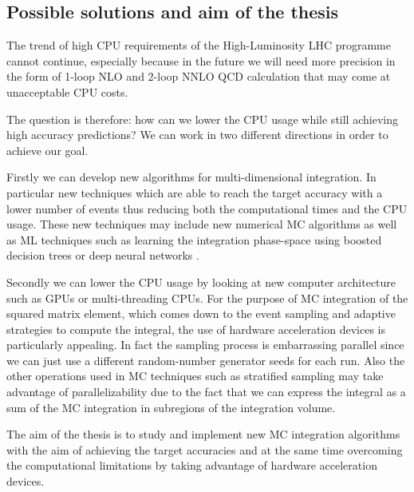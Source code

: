 \documentclass[../main/main.tex]{subfiles}
\begin{document}
\subsection{Possible solutions and aim of the thesis}

The trend of high CPU requirements of the High-Luminosity LHC programme cannot continue, especially because in the future we will need
more precision in the form of 1-loop NLO and 2-loop NNLO QCD calculation that may come at unacceptable CPU costs.

The question is therefore: how can we lower the CPU usage while still achieving high accuracy predictions?
We can work in two different directions in order to achieve our goal.

Firstly we can develop new algorithms for multi-dimensional integration. In particular new techniques which are able to reach the target accuracy
with a lower number of events thus reducing both the computational times and the CPU usage. These new techniques may include new numerical
MC algorithms as well as ML techniques such as  learning the integration phase-space using boosted decision trees \cite{Bendavid:2017zhk} or deep neural networks \cite{unknown}. 


Secondly we can lower the CPU usage by looking at new computer architecture such as GPUs or multi-threading CPUs.
 For the purpose of MC integration of the squared matrix element, which comes down to the event sampling and adaptive strategies to compute
 the integral, the use of hardware acceleration devices is particularly appealing. In fact the sampling process is embarrassing parallel since we can
 just use a different random-number generator seeds for each run. Also the other operations used in MC techniques such as stratified sampling may
 take advantage of parallelizability due to the fact that we can express the integral as a sum of the MC integration in subregions of the integration volume.
 
 The aim of the thesis is to study and implement new MC integration algorithms with the aim of achieving the target accuracies and at the same time overcoming the computational limitations by taking advantage of hardware acceleration devices.

























 


 
\end{document}
